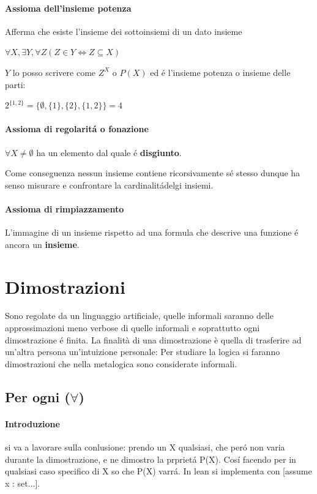 \documentclass{article}
\begin{document}
\paragraph{Assioma dell'insieme potenza} Afferma che esiste l'insieme dei sottoinsiemi di un dato insieme

\begin{center}
$\forall X,\exists Y,\forall Z(Z\in Y \Leftrightarrow Z\subseteq X)$
\end{center}

$Y$ lo posso scrivere come $Z^X$ o $P(X)$ ed é l'insieme potenza o insieme delle parti: 

$2^{\{1,2\}} = \{\emptyset, \{1\}, \{2\}, \{1,2\}\} = 4$

\paragraph{Assioma di regolaritá o fonazione}
\begin{center}
    $\forall X\not= \emptyset$ ha un elemento dal quale é \textbf{disgiunto}.
\end{center}
Come conseguenza nessun insieme contiene ricorsivamente sé stesso dunque ha senso misurare e confrontare la cardinalitádelgi insiemi.

\paragraph{Assioma di rimpiazzamento} L'immagine di un insieme rispetto ad una formula che descrive una funzione é ancora un \textbf{insieme}.

\section{Dimostrazioni}
Sono regolate da un linguaggio artificiale, quelle informali saranno delle approssimazioni meno verbose di quelle informali e soprattutto ogni dimostrazione é finita. La finalità di una dimostrazione è quella di trasferire ad un'altra persona un'intuizione personale: Per studiare la logica si faranno dimostrazioni che nella metalogica sono considerate informali.

\subsection{Per ogni ($\forall$)}
\paragraph{Introduzione} si va a lavorare sulla conlusione: prendo un X qualsiasi, che peró non varia durante la dimostrazione, e ne dimostro la prprietá P(X). Cosí facendo per in qualsiasi caso specifico di X so che P(X) varrá. In lean si implementa con [assume x : set...].
\end{document}
